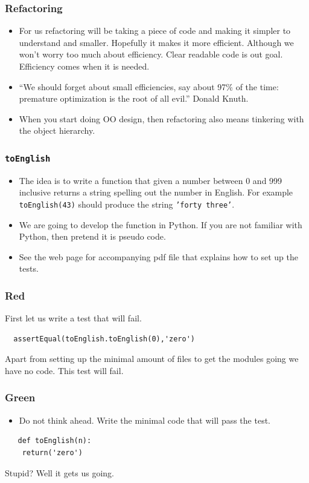 \documentclass{beamer}
\begin{document}
\begin{frame}
  \frametitle{Refactoring}
  \begin{itemize}
  \item For us refactoring will be taking a piece of code and making
    it simpler to understand and smaller. Hopefully it makes it more
    efficient. Although we won't worry too much about
    efficiency. Clear readable code is out goal. Efficiency comes when
    it is needed.
  \item ``We should forget about small efficiencies, say about 97\% of
    the time: premature optimization is the root of all evil.'' Donald Knuth.
  \item When you start doing OO design, then refactoring  also means
    tinkering with the object hierarchy.
  \end{itemize}
\end{frame}
\begin{frame}
  \frametitle{{\tt toEnglish}}

  \begin{itemize}
  \item  The idea is to write a function that given a number between 0 and 999
inclusive returns a string spelling out the number in English. For
example {\tt toEnglish(43)} should produce the string {\tt 'forty
  three'}. 
\item We are going to develop the function in Python. If you are
not familiar with Python, then  pretend it is pseudo code.
\item See the web page for accompanying pdf file that explains how to
  set up the tests. 
  \end{itemize}
\end{frame}
\begin{frame}[fragile]
  \frametitle{Red}
  First let us  write a test that will fail.
  \color{red}
\begin{lstlisting}
  assertEqual(toEnglish.toEnglish(0),'zero')
\end{lstlisting}
\color{black}
Apart from setting up the minimal amount of files to get the modules
going we have no code. This test will fail.
\end{frame}
\begin{frame}[fragile]
  \frametitle{Green}
  \begin{itemize}
  \item Do not think ahead. Write the minimal code that will pass the test.
  \end{itemize}
  \begin{lstlisting}
   def toEnglish(n):
    return('zero')
  \end{lstlisting}
Stupid? Well it gets us going.
\end{frame}
\end{document}
